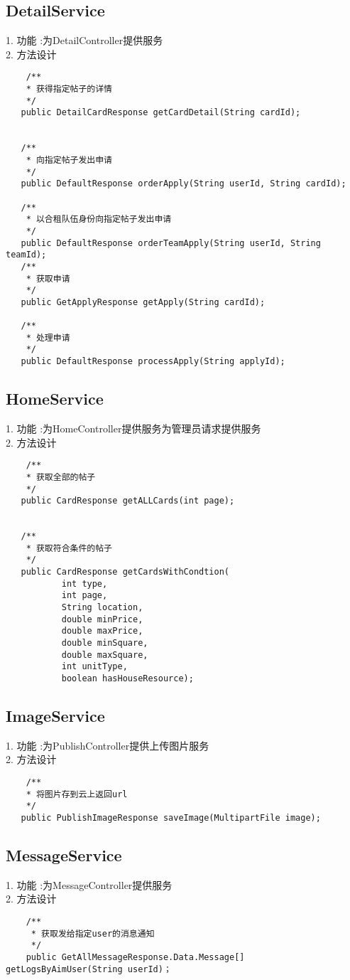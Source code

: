 \subsection{DetailService}
1. 功能 :为DetailController提供服务 \\
2. 方法设计
\begin{lstlisting}
    /**
    * 获得指定帖子的详情
    */
   public DetailCardResponse getCardDetail(String cardId);


   /**
    * 向指定帖子发出申请
    */
   public DefaultResponse orderApply(String userId, String cardId);

   /**
    * 以合租队伍身份向指定帖子发出申请
    */
   public DefaultResponse orderTeamApply(String userId, String teamId);
   /**
    * 获取申请
    */
   public GetApplyResponse getApply(String cardId);

   /**
    * 处理申请
    */
   public DefaultResponse processApply(String applyId);
\end{lstlisting}

\subsection{HomeService}
1. 功能 :为HomeController提供服务为管理员请求提供服务 \\
2. 方法设计
\begin{lstlisting}
    /**
    * 获取全部的帖子
    */
   public CardResponse getALLCards(int page);


   /**
    * 获取符合条件的帖子
    */
   public CardResponse getCardsWithCondtion(
           int type,
           int page,
           String location,
           double minPrice,
           double maxPrice,
           double minSquare,
           double maxSquare,
           int unitType,
           boolean hasHouseResource);
\end{lstlisting}

\subsection{ImageService}
1. 功能 :为PublishController提供上传图片服务 \\
2. 方法设计
\begin{lstlisting}
    /**
    * 将图片存到云上返回url
    */
   public PublishImageResponse saveImage(MultipartFile image);
\end{lstlisting}

\subsection{MessageService}
1. 功能 :为MessageController提供服务 \\
2. 方法设计
\begin{lstlisting}
    /**
     * 获取发给指定user的消息通知
     */
    public GetAllMessageResponse.Data.Message[] getLogsByAimUser(String userId)；
\end{lstlisting}


